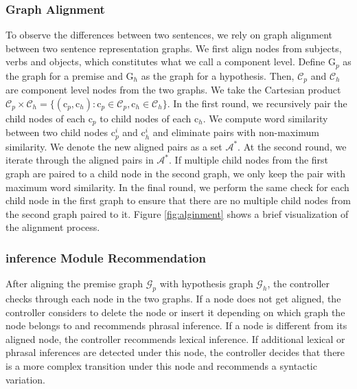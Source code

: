 \documentclass[11pt,a4paper]{article}
\begin{document}
\subsubsection{Graph Alignment}
To observe the differences between two sentences, we rely on graph alignment between two sentence representation graphs. We first align nodes from subjects, verbs and objects, which constitutes what we call a component level. Define $\mathrm{G}_p$ as the graph for a premise and $\mathrm{G}_h$ as the graph for a hypothesis. Then, $\mathcal{C}_p$ and $\mathcal{C}_h$ are component level nodes from the two graphs. We take
the Cartesian product   $\mathcal{C}_p\times \mathcal{C}_h
= \{(\mathrm{c}_p, \mathrm{c}_h): \mathrm{c}_p \in \mathcal{C}_p, \mathrm{c}_h \in \mathcal{C}_h \}$. In the first round, we recursively pair the child nodes of each $\mathrm{c}_p$ to child nodes of each $\mathrm{c}_h$. 
We compute word similarity between two child nodes $\mathrm{c}_p^i$ and $\mathrm{c}_h^i$ and eliminate pairs with non-maximum similarity. We denote the new aligned pairs as a set $\mathcal{A}^*$. At the second round, we iterate through the aligned pairs in $\mathcal{A}^*$. If multiple child nodes from the first graph are paired to a child node in the second graph, we only keep the pair with maximum word similarity. In the final round, we perform the same check for each child node in the first graph to ensure that there are no multiple child nodes from the second graph paired to it. Figure \ref{fig:alginment} shows a brief visualization of the alignment process. 

\subsubsection{inference Module Recommendation}
After aligning the premise graph $\mathcal{G}_{p}$ with hypothesis graph $\mathcal{G}_{h}$, the controller checks through each node in the two graphs. If a node does not get aligned, the controller considers to delete the node or insert it depending on which graph the node belongs to and recommends phrasal inference. If a node is different from its aligned node, the controller recommends lexical inference. If additional lexical or phrasal inferences are detected under this node, the controller decides that there is a more complex transition under this node and recommends a syntactic variation.
\end{document}
